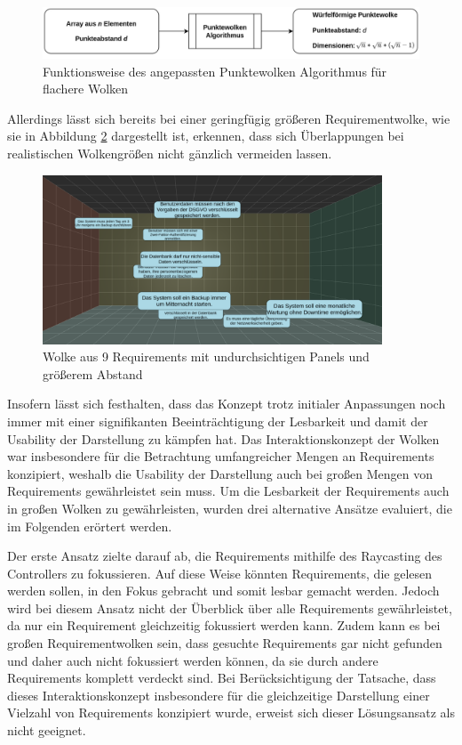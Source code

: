 \begin{figure}[H]
    \centering
    \includegraphics[width=1\textwidth]{images/WolkenAlgoAngepasst.png}
    \caption{Funktionsweise des angepassten Punktewolken Algorithmus für flachere Wolken}
    \label{fig:wolken-algo-ang}
\end{figure}

\newpage

Allerdings lässt sich bereits bei einer geringfügig größeren Requirementwolke, wie sie in Abbildung \ref{fig:wolken-prototyp-3} dargestellt ist, erkennen, dass sich Überlappungen bei realistischen Wolkengrößen nicht gänzlich vermeiden lassen. 

\begin{figure}[H]
    \centering
    \includegraphics[width=0.9\textwidth]{images/WolkenPrototyp3.png}
    \caption{Wolke aus 9 Requirements mit undurchsichtigen Panels und größerem Abstand}
    \label{fig:wolken-prototyp-3}
\end{figure}

Insofern lässt sich festhalten, dass das Konzept trotz initialer Anpassungen noch immer mit einer signifikanten Beeinträchtigung der Lesbarkeit und damit der Usability der Darstellung zu kämpfen hat.
Das Interaktionskonzept der Wolken war insbesondere für die Betrachtung umfangreicher Mengen an Requirements konzipiert, weshalb die Usability der Darstellung auch bei großen Mengen von Requirements gewährleistet sein muss.
Um die Lesbarkeit der Requirements auch in großen Wolken zu gewährleisten, wurden drei alternative Ansätze evaluiert, die im Folgenden erörtert werden.

Der erste Ansatz zielte darauf ab, die Requirements mithilfe des Raycasting des Controllers zu fokussieren.
Auf diese Weise könnten Requirements, die gelesen werden sollen, in den Fokus gebracht und somit lesbar gemacht werden.
Jedoch wird bei diesem Ansatz nicht der Überblick über alle Requirements gewährleistet, da nur ein Requirement gleichzeitig fokussiert werden kann.
Zudem kann es bei großen Requirementwolken sein, dass gesuchte Requirements gar nicht gefunden und daher auch nicht fokussiert werden können, da sie durch andere Requirements komplett verdeckt sind.
Bei Berücksichtigung der Tatsache, dass dieses Interaktionskonzept insbesondere für die gleichzeitige Darstellung einer Vielzahl von Requirements konzipiert wurde, erweist sich dieser Lösungsansatz als nicht geeignet.

